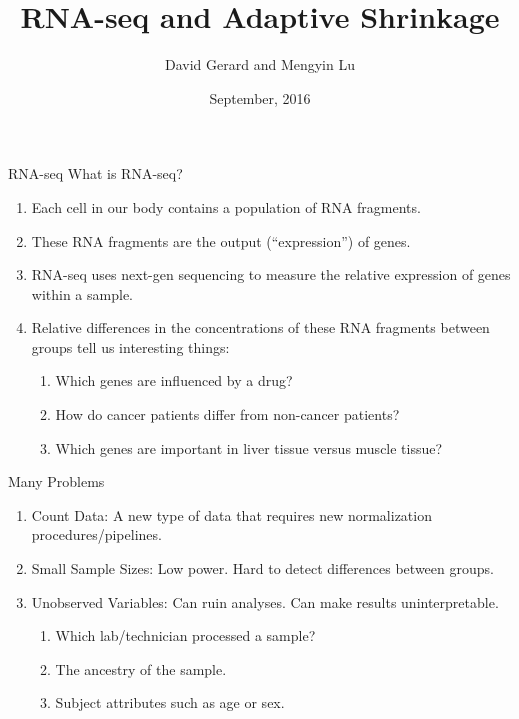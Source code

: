 \documentclass[evncountsect]{beamer}
\title{RNA-seq and Adaptive Shrinkage}
\author{David Gerard and Mengyin Lu}
\institute[UChicago]{
  Department of Human Genetics\\
  University of Chicago\\
  Boss: Matthew Stephens
}
\date[September 2016]{September, 2016}
\begin{document}
\begin{frame}
  \titlepage
\end{frame}

\begin{frame}{RNA-seq}
  What is RNA-seq?
  \begin{enumerate}
  \item Each cell in our body contains a population of RNA fragments. \medskip
  \item These RNA fragments are the output (``expression'') of genes.\medskip
  \item RNA-seq uses next-gen sequencing to measure the relative
    expression of genes within a sample.\medskip
  \item Relative differences in the concentrations of these RNA
    fragments between groups tell us interesting things:
    \begin{enumerate}
    \item Which genes are influenced by a drug?\smallskip
    \item How do cancer patients differ from non-cancer patients?\smallskip
    \item Which genes are important in liver tissue versus muscle tissue?
    \end{enumerate}
  \end{enumerate}

\end{frame}


\begin{frame}{Many Problems}
  \begin{enumerate}
  \item Count Data: A new type of data that requires new normalization
    procedures/pipelines.\medskip
  \item Small Sample Sizes: Low power. Hard to detect differences between groups.\medskip
  \item Unobserved Variables: Can ruin analyses. Can make results uninterpretable.
    \begin{enumerate}
    \item Which lab/technician processed a sample?\smallskip
    \item The ancestry of the sample.\smallskip
    \item Subject attributes such as age or sex.
    \end{enumerate}
  \end{enumerate}
\end{frame}
\end{document}
